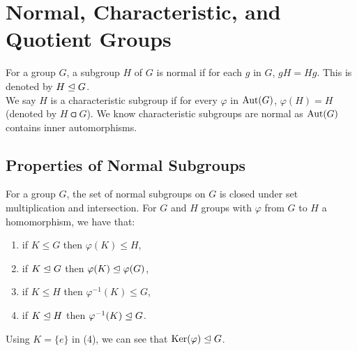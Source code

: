 \section{Normal, Characteristic, and Quotient Groups}

For a group $G$, a subgroup $H$ of $G$ is normal if for each $g$ in $G$,
$gH = Hg$. This is denoted by $H \trianglelefteq G$.
\\[\baselineskip]
We say $H$ is a characteristic subgroup if for every $\varphi$ in $\operatorname{Aut}(G)$,
$\varphi(H) = H$ (denoted by $H \csub G$). We know characteristic subgroups
are normal as $\operatorname{Aut}(G)$ contains inner automorphisms.

\subsection{Properties of Normal Subgroups} \label{2.14} \label{2.15} \label{2.16} \label{2.17}

For a group $G$, the set of normal subgroups on $G$
is closed under set multiplication and intersection. For $G$ and $H$
groups with $\varphi$ from $G$ to $H$ a homomorphism, we have that: \begin{enumerate}
    \item if $K \leq G$ then $\varphi(K) \leq H$,
    \item if $K \trianglelefteq G$ then $\varphi(K) \trianglelefteq \varphi(G)$,
    \item if $K \leq H$ then $\varphi^{-1}(K) \leq G$,
    \item if $K \trianglelefteq H$ then $\varphi^{-1}(K) \trianglelefteq G$.
\end{enumerate} Using $K = \{e\}$ in (4), we can see that $\operatorname{Ker}(\varphi) \trianglelefteq G$.


